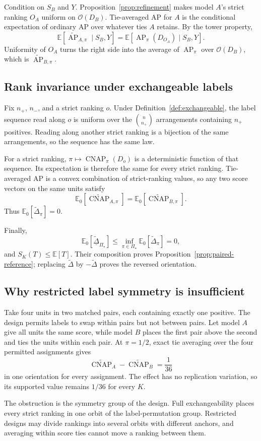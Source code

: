 \documentclass[11pt]{article}
\newcommand{\AP}{\operatorname{AP}}
\newcommand{\CNAP}{\operatorname{CNAP}}
\newcommand{\PSet}{\Pi_\star}
\newcommand{\E}{\mathbb{E}}
\newcommand{\APta}{\widetilde{\AP}}
\newcommand{\CNAPta}{\widetilde{\CNAP}}
\newcommand{\Dta}{\widetilde{\Delta}}
\newcommand{\RobDta}{\underline{\widetilde{\Delta}}_{\PSet}}
\theoremstyle{remark}
\begin{document}
Condition on $S_B$ and $Y$. Proposition~\ref{prop:refinement} makes model $A$'s strict ranking $O_A$ uniform on $\mathcal O(D_B)$. Tie-averaged AP for $A$ is the conditional expectation of ordinary AP over whatever ties $A$ retains. By the tower property,
\[
\E[\APta_{A,\pi}\mid S_B,Y]
=
\E[\AP_\pi(D_{O_A})\mid S_B,Y].
\]
Uniformity of $O_A$ turns the right side into the average of $\AP_\pi$ over $\mathcal O(D_B)$, which is $\APta_{B,\pi}$.

\subsection{Rank invariance under exchangeable labels}

Fix $n_+$, $n_-$, and a strict ranking $o$. Under Definition~\ref{def:exchangeable}, the label sequence read along $o$ is uniform over the $\binom n{n_+}$ arrangements containing $n_+$ positives. Reading along another strict ranking is a bijection of the same arrangements, so the sequence has the same law.

For a strict ranking, $\pi\mapsto\CNAP_\pi(D_o)$ is a deterministic function of that sequence. Its expectation is therefore the same for every strict ranking. Tie-averaged AP is a convex combination of strict-ranking values, so any two score vectors on the same units satisfy
\[
\E_0[\CNAPta_{A,\pi}]
=
\E_0[\CNAPta_{B,\pi}].
\]
Thus $\E_0[\Dta_\pi]=0$.

Finally,
\[
\E_0[\RobDta]
\leq
\inf_{\pi\in\PSet}\E_0[\Dta_\pi]
=0,
\]
and $S_K(T)\leq\E[T]$. Their composition proves Proposition~\ref{prop:paired-reference}; replacing $\Dta$ by $-\Dta$ proves the reversed orientation.

\subsection{Why restricted label symmetry is insufficient}

Take four units in two matched pairs, each containing exactly one positive. The design permits labels to swap within pairs but not between pairs. Let model $A$ give all units the same score, while model $B$ places the first pair above the second and ties the units within each pair. At $\pi=1/2$, exact tie averaging over the four permitted assignments gives
\[
\CNAPta_A-\CNAPta_B
=
\frac1{36}
\]
in one orientation for every assignment. The effect has no replication variation, so its supported value remains $1/36$ for every $K$.

The obstruction is the symmetry group of the design. Full exchangeability places every strict ranking in one orbit of the label-permutation group. Restricted designs may divide rankings into several orbits with different anchors, and averaging within score ties cannot move a ranking between them.
\end{document}
